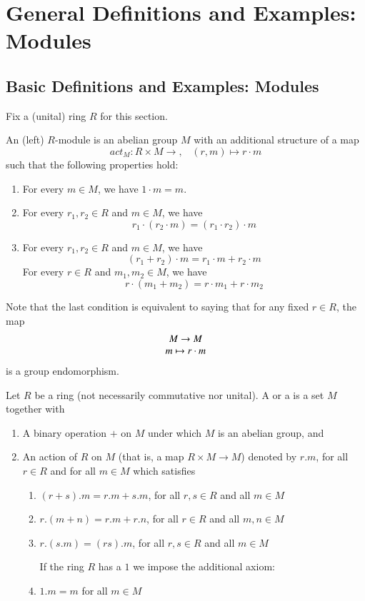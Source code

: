 \chapter{\textsection\textsection General Definitions and Examples: Modules}


\section{\textsection Basic Definitions and Examples: Modules}

Fix a (unital) ring $R$ for this section.

\begin{defn}
    An (left) $R$-module is an abelian group $M$ with an additional structure of a map \begin{equation}
        act_M:R\times M \rightarrow,\;\;\;(r,m)\mapsto r\cdot m
    \end{equation}
    such that the following properties hold:\begin{enumerate}
        \item For every $m \in M$, we have $1 \cdot m = m$.
        \item For every $r_1,r_2 \in R$ and $m \in M$, we have $$r_1\cdot(r_2\cdot m) = (r_1\cdot r_2)\cdot m$$
        \item For every $r_1,r_2 \in R$ and $m \in M$, we have $$(r_1+r_2)\cdot m = r_1\cdot m + r_2\cdot m$$
        For every $r \in R$ and $m_1,m_2 \in M$, we have $$r\cdot (m_1+m_2) = r\cdot m_1 + r\cdot m_2$$
    \end{enumerate}
    Note that the last condition is equivalent to saying that for any fixed $r \in R$, the map $$\begin{array}{c} M\rightarrow M \\ m\mapsto r\cdot m \end{array}$$
    is a group endomorphism.
\end{defn}

\begin{defn}[(General)]
    Let $R$ be a ring (not necessarily commutative nor unital). A  or a  is a set $M$ together with \begin{enumerate}
        \item A binary operation $+$ on $M$ under which $M$ is an abelian group, and
        \item An action of $R$ on $M$ (that is, a map $R\times M \rightarrow M$) denoted by $r.m$, for all $r \in R$ and for all $m \in M$ which satisfies \begin{enumerate}
                \item $(r+s).m = r.m + s.m$, for all $r,s \in R$ and all $m \in M$
                \item $r.(m+n) = r.m + r.n$, for all $r \in R$ and all $m,n \in M$
                \item $r.(s.m) = (rs).m$, for all $r,s \in R$ and all $m \in M$

                    \noindent If the ring $R$ has a $1$ we impose the additional axiom:
                \item $1.m = m$ for all $m \in M$
        \end{enumerate}
    \end{enumerate}
\end{defn}


